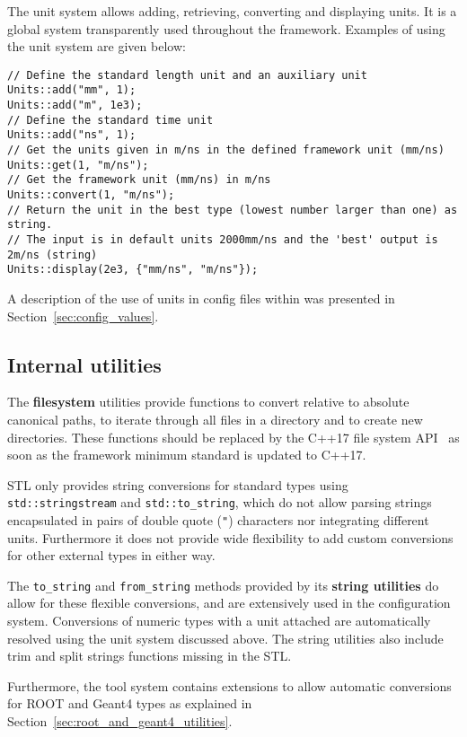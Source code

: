 The unit system allows adding, retrieving, converting and displaying units.
It is a global system transparently used throughout the framework.
Examples of using the unit system are given below:
\begin{verbatim}
// Define the standard length unit and an auxiliary unit
Units::add("mm", 1);
Units::add("m", 1e3);
// Define the standard time unit
Units::add("ns", 1);
// Get the units given in m/ns in the defined framework unit (mm/ns)
Units::get(1, "m/ns");
// Get the framework unit (mm/ns) in m/ns
Units::convert(1, "m/ns");
// Return the unit in the best type (lowest number larger than one) as string.
// The input is in default units 2000mm/ns and the 'best' output is 2m/ns (string)
Units::display(2e3, {"mm/ns", "m/ns"});
\end{verbatim}

A description of the use of units in config files within \apsq was presented in Section~\ref{sec:config_values}.

\subsection{Internal utilities}
\label{sec:filesystem}
The \textbf{filesystem} utilities provide functions to convert relative to absolute canonical paths, to iterate through all files in a directory and to create new directories.
These functions should be replaced by the C++17 file system API~\cite{cppfilesystem} as soon as the framework minimum standard is updated to C++17.

\label{sec:string_utilities}
STL only provides string conversions for standard types using \texttt{std::stringstream} and \texttt{std::to\_string}, which do not allow parsing strings encapsulated in pairs of double quote (\texttt{"}) characters nor integrating different units.
Furthermore it does not provide wide flexibility to add custom conversions for other external types in either way.

The \apsq \texttt{to\_string} and \texttt{from\_string} methods provided by its \textbf{string utilities} do allow for these flexible conversions, and are extensively used in the configuration system.
Conversions of numeric types with a unit attached are automatically resolved using the unit system discussed above.
The string utilities also include trim and split strings functions missing in the STL.

Furthermore, the \apsq tool system contains extensions to allow automatic conversions for ROOT and Geant4 types as explained in Section~\ref{sec:root_and_geant4_utilities}.


